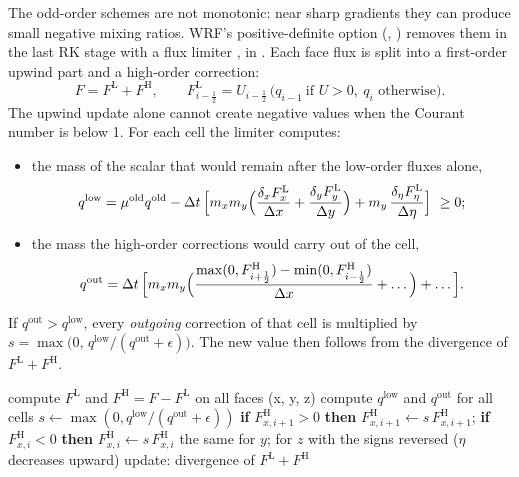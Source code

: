 The odd-order schemes are not monotonic: near sharp gradients they can produce small negative mixing ratios. WRF's
positive-definite option (, ) removes them in the last RK stage with a
flux limiter \citep{skamarock2009}, in . Each face flux is split into a
first-order upwind part and a high-order correction:
\begin{equation}
  F = F^{\mathrm{L}} + F^{\mathrm{H}}, \qquad
  F^{\mathrm{L}}_{i-\frac12} = U_{i-\frac12}\,\bigl(q_{i-1}\ \text{if } U > 0,\ q_i \text{ otherwise}\bigr).
\end{equation}
The upwind update alone cannot create negative values when the Courant number is below 1. For each cell the limiter
computes:
\begin{itemize}
  \item the mass of the scalar that would remain after the low-order fluxes alone,
    \begin{equation}
      q^{\mathrm{low}} = \mu^{\mathrm{old}} q^{\mathrm{old}} - \Delta t\,\Bigl[m_x m_y\Bigl(\frac{\delta_x F^{\mathrm{L}}_x}{\Delta x}
                         + \frac{\delta_y F^{\mathrm{L}}_y}{\Delta y}\Bigr) + m_y\,\frac{\delta_\eta F^{\mathrm{L}}_\eta}{\Delta\eta}\Bigr] \ \ge 0;
    \end{equation}
  \item the mass the high-order corrections would carry out of the cell,
    \begin{equation}
      q^{\mathrm{out}} = \Delta t\,\Bigl[m_x m_y\Bigl(\frac{\max(0, F^{\mathrm{H}}_{i+\frac12}) - \min(0, F^{\mathrm{H}}_{i-\frac12})}{\Delta x} + \dots\Bigr) + \dots\Bigr].
    \end{equation}
\end{itemize}
If $q^{\mathrm{out}} > q^{\mathrm{low}}$, every \emph{outgoing} correction of that cell is multiplied by
$s = \max\bigl(0,\, q^{\mathrm{low}}/(q^{\mathrm{out}} + \epsilon)\bigr)$. The new value then follows from the
divergence of $F^{\mathrm{L}} + F^{\mathrm{H}}$.

\begin{algorithm}[ht]
\caption{The positive-definite limiter of , as written for a CPU.}
\label{alg:pd}
\begin{algorithmic}[1]
\State compute $F^{\mathrm{L}}$ and $F^{\mathrm{H}} = F - F^{\mathrm{L}}$ on all faces (x, y, z)
\State compute $q^{\mathrm{low}}$ and $q^{\mathrm{out}}$ for all cells
    \State $s \gets \max(0, q^{\mathrm{low}}/(q^{\mathrm{out}} + \epsilon))$
    \State \textbf{if} $F^{\mathrm{H}}_{x,i+1} > 0$ \textbf{then} $F^{\mathrm{H}}_{x,i+1} \gets s\,F^{\mathrm{H}}_{x,i+1}$; \quad
           \textbf{if} $F^{\mathrm{H}}_{x,i} < 0$ \textbf{then} $F^{\mathrm{H}}_{x,i} \gets s\,F^{\mathrm{H}}_{x,i}$
    \State the same for $y$; for $z$ with the signs reversed ($\eta$ decreases upward)
  \EndIf
\EndFor
\State update: divergence of $F^{\mathrm{L}} + F^{\mathrm{H}}$
\end{algorithmic}
\end{algorithm}

